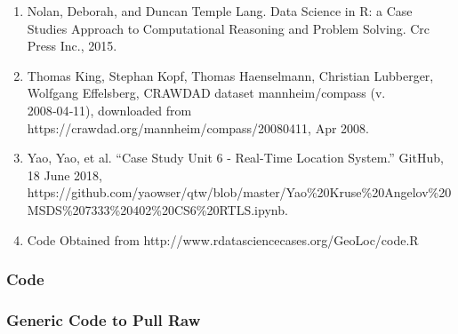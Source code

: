 \documentclass[11pt]{article}
\providecommand{\tightlist}{%
      \setlength{\itemsep}{0pt}\setlength{\parskip}{0pt}}
\begin{document}
\begin{enumerate}
\def\labelenumi{\arabic{enumi}.}
\tightlist
\item
  Nolan, Deborah, and Duncan Temple Lang. Data Science in R: a Case
  Studies Approach to Computational Reasoning and Problem Solving. Crc
  Press Inc., 2015.
\item
  Thomas King, Stephan Kopf, Thomas Haenselmann, Christian Lubberger,
  Wolfgang Effelsberg, CRAWDAD dataset mannheim/compass (v. 2008‑04‑11),
  downloaded from https://crawdad.org/mannheim/compass/20080411, Apr
  2008.
\item
  Yao, Yao, et al. ``Case Study Unit 6 - Real-Time Location System.''
  GitHub, 18 June 2018,
  https://github.com/yaowser/qtw/blob/master/Yao\%20Kruse\%20Angelov\%20MSDS\%207333\%20402\%20CS6\%20RTLS.ipynb.
\item
  Code Obtained from http://www.rdatasciencecases.org/GeoLoc/code.R
\end{enumerate}

    \subsubsection{Code}\label{code}

    \subsubsection{Generic Code to Pull Raw}\label{generic-code-to-pull-raw}
\end{document}
